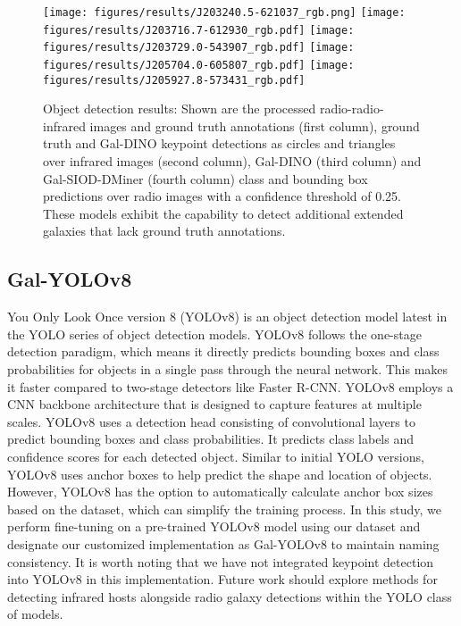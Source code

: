 \documentclass[
  journal=pasa,
  manuscript=research-paper, %
  year=2020,
  volume=37,
]{cup-journal}
\begin{document}
%
\begin{figure*}
\centering
\texttt{[image: figures/results/J203240.5-621037\_rgb.png]}
\texttt{[image: figures/results/J203716.7-612930\_rgb.pdf]}
\texttt{[image: figures/results/J203729.0-543907\_rgb.pdf]}
\texttt{[image: figures/results/J205704.0-605807\_rgb.pdf]}
\texttt{[image: figures/results/J205927.8-573431\_rgb.pdf]}
\caption{Object detection results: Shown are the processed radio-radio-infrared images and ground truth annotations (first column), ground truth and Gal-DINO keypoint detections as circles and triangles over infrared images (second column), Gal-DINO (third column) and Gal-SIOD-DMiner (fourth column) class and bounding box predictions over radio images with a confidence threshold of 0.25. These models exhibit the capability to detect additional extended galaxies that lack ground truth annotations.} 
\label{FIG:Results}
\end{figure*}

\subsection{Gal-YOLOv8}
\label{SEC:GalYOLO}
You Only Look Once version 8 (YOLOv8) is an object detection model latest in the YOLO \citep[][]{redmon2016you} series of object detection models. 
YOLOv8 follows the one-stage detection paradigm, which means it directly predicts bounding boxes and class probabilities for objects in a single pass through the neural network. This makes it faster compared to two-stage detectors like Faster R-CNN.
YOLOv8 employs a CNN backbone architecture that is designed to capture features at multiple scales.
YOLOv8 uses a detection head consisting of convolutional layers to predict bounding boxes and class probabilities. It predicts class labels and confidence scores for each detected object.
Similar to initial YOLO versions, YOLOv8 uses anchor boxes to help predict the shape and location of objects. However, YOLOv8 has the option to automatically calculate anchor box sizes based on the dataset, which can simplify the training process.
In this study, we perform fine-tuning on a pre-trained YOLOv8 model using our dataset and designate our customized implementation as Gal-YOLOv8 to maintain naming consistency. 
It is worth noting that we have not integrated keypoint detection into YOLOv8 in this implementation. 
Future work should explore methods for detecting infrared hosts alongside radio galaxy detections within the YOLO class of models.
\end{document}
